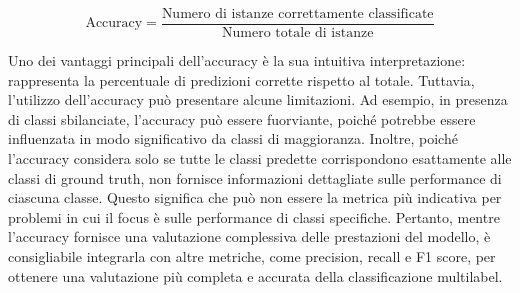 \documentclass[../../Thesis.tex]{subfiles}
\begin{document}
\[
\text{Accuracy} = \frac{\text{Numero di istanze correttamente classificate}}{\text{Numero totale di istanze}}
\]

Uno dei vantaggi principali dell'accuracy è la sua intuitiva interpretazione: rappresenta la percentuale di predizioni corrette rispetto al totale. Tuttavia, l'utilizzo dell'accuracy può presentare alcune limitazioni. Ad esempio, in presenza di classi sbilanciate, l'accuracy può essere fuorviante, poiché potrebbe essere influenzata in modo significativo da classi di maggioranza. Inoltre, poiché l'accuracy considera solo se tutte le classi predette corrispondono esattamente alle classi di ground truth, non fornisce informazioni dettagliate sulle performance di ciascuna classe. Questo significa che può non essere la metrica più indicativa per problemi in cui il focus è sulle performance di classi specifiche. Pertanto, mentre l'accuracy fornisce una valutazione complessiva delle prestazioni del modello, è consigliabile integrarla con altre metriche, come precision, recall e F1 score, per ottenere una valutazione più completa e accurata della classificazione multilabel.
\end{document}

